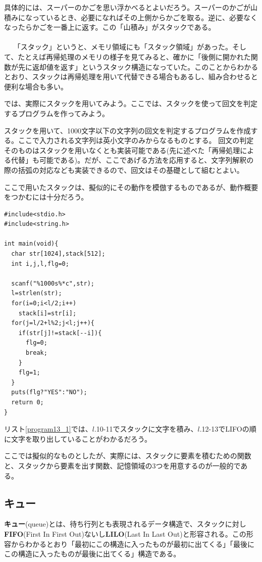 具体的には、スーパーのかごを思い浮かべるとよいだろう。スーパーのかごが山積みになっているとき、必要になればその上側からかごを取る。逆に、必要なくなったらかごを一番上に返す。この「山積み」がスタックである。
\\ \\　
「スタック」というと、メモリ領域にも「スタック領域」があった。そして、たとえば再帰処理のメモリの様子を見てみると、確かに「後側に開かれた関数が先に返却値を返す」というスタック構造になっていた。このことからわかるとおり、スタックは再帰処理を用いて代替できる場合もあるし、組み合わせると便利な場合も多い。

では、実際にスタックを用いてみよう。ここでは、スタックを使って回文を判定するプログラムを作ってみよう。
\begin{boxnote}
\begin{multicols}{2}
スタックを用いて、1000文字以下の文字列の回文を判定するプログラムを作成する。ここで入力される文字列は英小文字のみからなるものとする。
回文の判定そのものはスタックを用いなくとも実装可能である(先に述べた「再帰処理による代替」も可能である)。だが、ここであげる方法を応用すると、文字列解釈の際の括弧の対応なども実装できるので、回文はその基礎として組むとよい。

ここで用いたスタックは、擬似的にその動作を模倣するものであるが、動作概要をつかむには十分だろう。
\begin{lstlisting}[caption=回文判定(スタック利用),label=program13_1]
#include<stdio.h>
#include<string.h>

int main(void){
  char str[1024],stack[512];
  int i,j,l,flg=0;

  scanf("%1000s%*c",str);
  l=strlen(str);
  for(i=0;i<l/2;i++)
    stack[i]=str[i];
  for(j=l/2+l%2;j<l;j++){
    if(str[j]!=stack[--i]){
      flg=0;
      break;
    }
    flg=1;
  }
  puts(flg?"YES":"NO");
  return 0;
}
\end{lstlisting}
\end{multicols}
\end{boxnote}

リスト\ref{program13_1}では、$l$.10-11でスタックに文字を積み、$l$.12-13でLIFOの順に文字を取り出していることがわかるだろう。

ここでは擬似的なものとしたが、実際には、スタックに要素を積むための関数と、スタックから要素を出す関数、記憶領域の3つを用意するのが一般的である。

\subsection{キュー}
\textbf{キュー}(queue)とは、待ち行列とも表現されるデータ構造で、スタックに対し\textbf{FIFO}(First In First Out)ないし\textbf{LILO}(Last In Last Out)と形容される。この形容からわかるとおり「最初にこの構造に入ったものが最初に出てくる」「最後にこの構造に入ったものが最後に出てくる」構造である。

